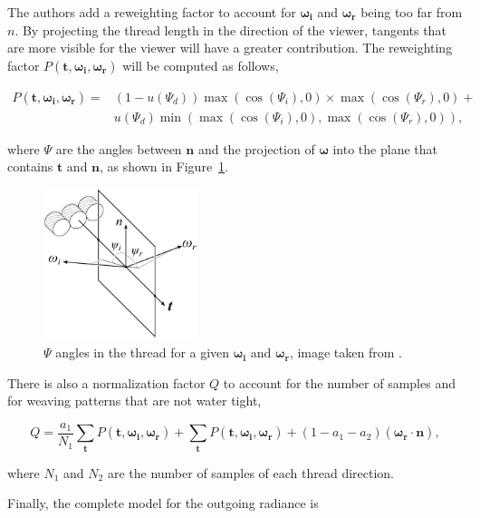 \documentclass[12pt]{article}
\newcommand{\omegai}{\boldsymbol{\omega_i}}
\newcommand{\omegar}{\boldsymbol{\omega_r}}
\newcommand{\tb}{\mathbf{t}}
\begin{document}
The authors add a reweighting factor to account for $\omegai$ and $\omegar$ being too far from $n$.
By projecting the thread length in the direction of the viewer, tangents that are more visible for the viewer will have a greater contribution.
The reweighting factor $P(\tb, \omegai, \omegar)$ will be computed as follows,

\begin{equation}
\begin{split}
P(\tb, \omegai, \omegar) =& (1 - u(\Psi_d)) \max(\cos(\Psi_i), 0) \times \max(\cos(\Psi_r), 0) + \\
& u(\Psi_d) \min( \max(\cos(\Psi_i), 0), \max(\cos(\Psi_r), 0) ),
\end{split}
\end{equation}

where $\Psi$ are the angles between $\mathbf{n}$ and the projection of $\boldsymbol{\omega}$ into the plane that contains $\tb$ and $\mathbf{n}$, as shown in Figure~\ref{fig:psi_thread_angles}.

\begin{figure}[htbp!]
\centering
\includegraphics[width=0.4\textwidth]{images/psi_thread_angles}
	\caption{$\Psi$ angles in the thread for a given $\omegai$ and $\omegar$, image taken from \cite{Sadeghi2013}.}
	\label{fig:psi_thread_angles}
\end{figure}

There is also a normalization factor $Q$ to account for the number of samples and for weaving patterns that are not water tight,

\begin{equation}
Q = \frac{a_1}{N_1} \sum_\tb P(\tb, \omegai, \omegar) + \sum_\tb P(\tb, \omegai, \omegar) + (1 - a_1 - a_2)(\omegar \cdot \mathbf{n}),
\end{equation}

where $N_1$ and $N_2$ are the number of samples of each thread direction.

Finally, the complete model for the outgoing radiance is
\end{document}
